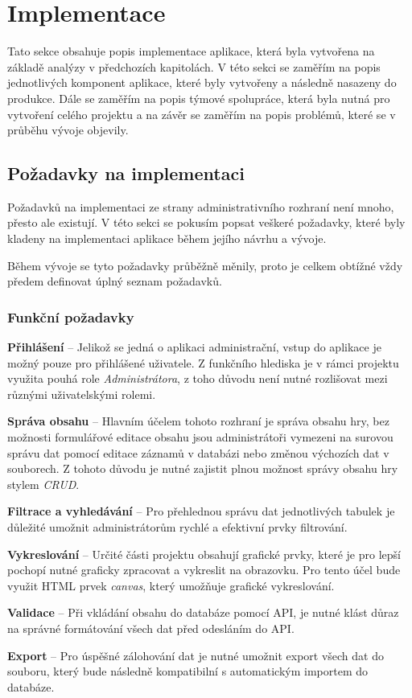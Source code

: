 \chapter{Implementace}
\label{ch:implementation}
Tato sekce obsahuje popis implementace aplikace, která byla vytvořena na základě analýzy v předchozích kapitolách. V této sekci se zaměřím na popis jednotlivých komponent aplikace, které byly vytvořeny a následně nasazeny do produkce. Dále se zaměřím na popis týmové spolupráce, která byla nutná pro vytvoření celého projektu a na závěr se zaměřím na popis problémů, které se v průběhu vývoje objevily.

\section{Požadavky na implementaci}
\label{sec:implementation-requirements}
Požadavků na implementaci ze strany administrativního rozhraní není mnoho, přesto ale existují. V této sekci se pokusím popsat veškeré požadavky, které byly kladeny na implementaci aplikace během jejího návrhu a vývoje.

Během vývoje se tyto požadavky průběžně měnily, proto je celkem obtížné vždy předem definovat úplný seznam požadavků.

\subsection*{Funkční požadavky}
\label{subsec:implementation-requirements-functional}

\begin{description}
    \item \textbf{Přihlášení} -- Jelikož se jedná o aplikaci administrační, vstup do aplikace je možný pouze pro přihlášené uživatele. Z funkčního hlediska je v rámci projektu využita pouhá role \textit{Administrátora}, z toho důvodu není nutné rozlišovat mezi různými uživatelskými rolemi.
    \item \textbf{Správa obsahu} -- Hlavním účelem tohoto rozhraní je správa obsahu hry, bez možnosti formulářové editace obsahu jsou administrátoři vymezeni na surovou správu dat pomocí editace záznamů v databázi nebo změnou výchozích dat v souborech. Z tohoto důvodu je nutné zajistit plnou možnost správy obsahu hry stylem \textit{CRUD}.
    \item \textbf{Filtrace a vyhledávání} -- Pro přehlednou správu dat jednotlivých tabulek je důležité umožnit administrátorům rychlé a efektivní prvky filtrování.
    \item \textbf{Vykreslování} -- Určité části projektu obsahují grafické prvky, které je pro lepší pochopí nutné graficky zpracovat a vykreslit na obrazovku. Pro tento účel bude využit HTML prvek \textit{canvas}, který umožňuje grafické vykreslování.
    \item \textbf{Validace} -- Při vkládání obsahu do databáze pomocí API, je nutné klást důraz na správné formátování všech dat před odesláním do API\@.
    \item \textbf{Export} -- Pro úspěšné zálohování dat je nutné umožnit export všech dat do souboru, který bude následně kompatibilní s automatickým importem do databáze.
\end{description}

